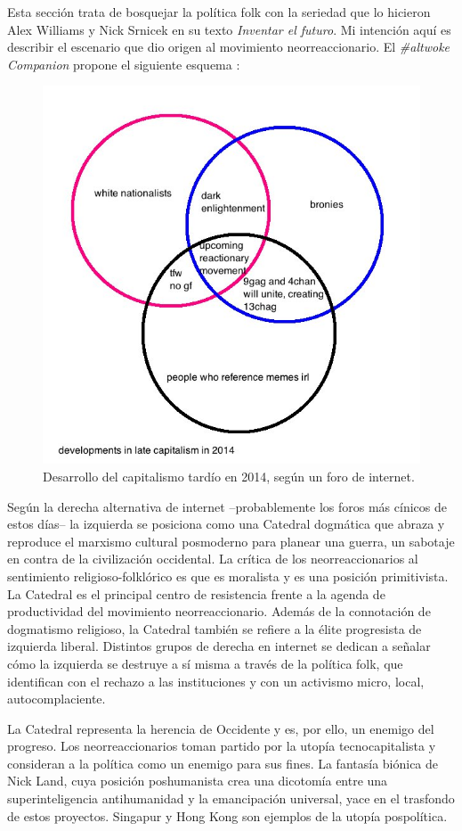 Esta sección trata de bosquejar la política folk con la seriedad que lo hicieron Alex Williams y Nick Srnicek en su texto \emph{Inventar el futuro}. Mi intención aquí es describir el escenario que dio origen al movimiento neorreaccionario. El \emph{\#altwoke Companion} propone el siguiente esquema \autocite{AltWokeCompanion2017}:

\begin{figure}[htb]
  \centering
  \includegraphics[width=0.7\linewidth]{images/internet-capitalism-2014.png}
  \caption{Desarrollo del capitalismo tardío en 2014, según un foro de internet.}
  \label{fig:capitalism2014}
\end{figure}

Según la derecha alternativa de internet --probablemente los foros más cínicos de estos días-- la izquierda se posiciona como una Catedral dogmática que abraza y reproduce el marxismo cultural posmoderno para planear una guerra, un sabotaje en contra de la civilización occidental. La crítica de los neorreaccionarios al sentimiento religioso-folklórico es que es moralista y es una posición primitivista. La Catedral es el principal centro de resistencia frente a la agenda de productividad del movimiento neorreaccionario. Además de la connotación de dogmatismo religioso, la Catedral también se refiere a la élite progresista de izquierda liberal. Distintos grupos de derecha en internet se dedican a señalar cómo la izquierda se destruye a sí misma a través de la política folk, que identifican con el rechazo a las instituciones y con un activismo micro, local, autocomplaciente.

La Catedral representa la herencia de Occidente y es, por ello, un enemigo del progreso. Los neorreaccionarios toman partido por la utopía tecnocapitalista y consideran a la política como un enemigo para sus fines. La fantasía biónica de Nick Land, cuya posición poshumanista crea una dicotomía entre una superinteligencia antihumanidad y la emancipación universal, yace en el trasfondo de estos proyectos. Singapur y Hong Kong son ejemplos de la utopía pospolítica.

